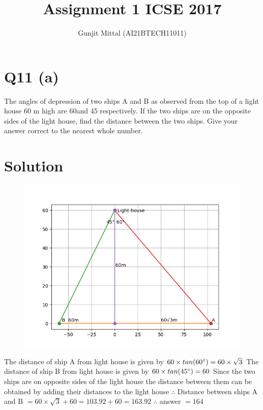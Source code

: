 \documentclass[12pt]{article}
\begin{document}
\title{Assignment 1 ICSE 2017}
\author{Gunjit Mittal (AI21BTECH11011)}
\maketitle
\section*{Q11 (a)}
The angles of depression of two ships A and B as observed from the top of a light 
house 60 m high are 60\degree and 45\degree
respectively. If the two ships are on the opposite 
sides of the light house, find the distance between the two ships. Give your answer 
correct to the nearest whole number.
\section*{Solution}
\begin{figure}[h]
    \centering
    \includegraphics[scale=0.6]{./figs/11.a.png}
\end{figure}
\par 
The distance of ship A from light house is given by $60 \times tan(60\degree) = 60 \times \sqrt{3} $
\newline
The distance of ship B from light house is given by $60 \times tan(45\degree) = 60 $
\newline
Since the two ships are on opposite sides of the light house the distance between them can be obtained by adding their distances to the light house 
\newline
$\therefore$ Distance between ships A and B $= 60 \times \sqrt3 + 60 = 103.92 + 60 = 163.92$
\newline 
$\therefore$ answer $= 164 $
\end{document}
